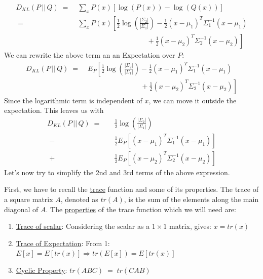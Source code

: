 \documentclass[12pt]{report}
\begin{document}
\begin{align*}
    D_{KL} (P \,||\, Q)
    \;=&\; \sum_x P(x) \left[\log(P(x)) - \log(Q(x)) \right] \\
    \;=&\; \sum_x P(x) \left[ \frac{1}{2}\log\left(\frac{|\Sigma_2|}{|\Sigma_1|}\right)
        - \frac{1}{2}(x-\mu_1)^T\Sigma_1^{-1} (x - \mu_1) \right. \\
       &\left.\qquad\qquad\qquad\qquad\quad\;\;\;\,
        + \frac{1}{2}(x-\mu_2)^T\Sigma_2^{-1} (x - \mu_2)\right]
\end{align*}
We can rewrite the above term an an Expectation over $P$:
\begin{align*}
    D_{KL} (P \,||\, Q)
    \;=&\; E_P \left[ \frac{1}{2}\log\left(\frac{|\Sigma_2|}{|\Sigma_1|}\right)
        - \frac{1}{2}(x-\mu_1)^T\Sigma_1^{-1} (x - \mu_1) \right. \\
       &\left.\qquad\qquad\qquad\quad\;\;\,
        + \frac{1}{2}(x-\mu_2)^T\Sigma_2^{-1} (x - \mu_2)\right]
\end{align*}
Since the logarithmic term is independent of $x$, we can move it outside the
expectation. This leaves us with
\begin{align}\label{eq:kld_exp}
    D_{KL} (P \,||\, Q)
    \;=\quad &\frac{1}{2}\log\left(\frac{|\Sigma_2|}{|\Sigma_1|}\right) \nonumber \\
       \; -\, &\frac{1}{2} E_P \left[ (x-\mu_1)^T\Sigma_1^{-1} (x - \mu_1) \right]
            \nonumber \\
       \; +\, &\frac{1}{2} E_P \left[ (x-\mu_2)^T\Sigma_2^{-1} (x - \mu_2) \right]
\end{align}
Let's now try to simplify the 2nd and 3rd terms of the above expression.
\bigskip

\noindent First, we have to recall the
\href{https://en.wikipedia.org/wiki/Trace_(linear_algebra)}{trace}
function and some of its properties. The trace of a square matrix $A$,
denoted as $tr(A)$, is the sum of the elements along the main diagonal of $A$.
The \href{https://en.wikipedia.org/wiki/Trace_(linear_algebra)#Properties}{properties}
of the trace function which we will need are:
\begin{enumerate}
    \item \href{https://math.stackexchange.com/questions/3098841/how-could-a-scalar-
        be-equal-to-the-trace-of-the-same-scalar}{Trace of scalar}:
        Considering the scalar as a $1\times1$ matrix, gives: $x = tr(x)$
    \item \href{https://math.stackexchange.com/questions/2228398/trace-trick-for-
        expectations-of-quadratic-forms}{Trace of Expectation}:
        From 1: $E[x] = E[tr(x)] \Rightarrow tr(E[x]) = E[tr(x)]$
    \item \href{https://en.wikipedia.org/wiki/Trace_(linear_algebra)#Cyclic_property}
        {Cyclic Property}: $tr(ABC) \;=\; tr(CAB)$
\end{enumerate}
\clearpage
\end{document}
